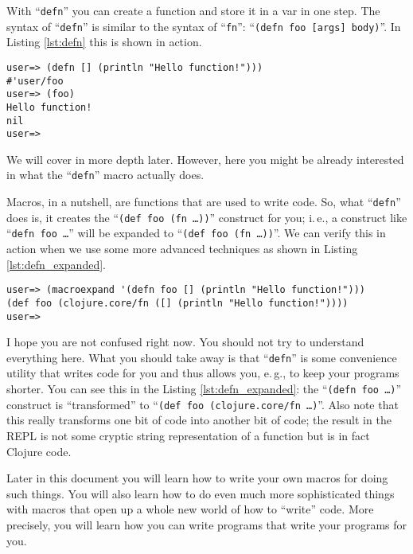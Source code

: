 With ``\texttt{defn}'' you can create a function and store it in a var in one step.
The syntax of ``\texttt{defn}'' is similar to the syntax of ``\texttt{fn}'': ``\texttt{(defn foo [args] body)}''.
In Listing \vref{lst:defn} this is shown in action.

\begin{lstlisting}[label=lst:defn, caption=``\texttt{defn}'' as Shortcut]
user=> (defn [] (println "Hello function!")))
#'user/foo
user=> (foo)
Hello function!
nil
user=> 
\end{lstlisting}

We will cover  in more depth later.
However, here you might be already interested in what the ``\texttt{defn}'' macro actually does.

Macros, in a nutshell, are functions that are used to write code.
So, what ``\texttt{defn}'' does is, it creates the ``\texttt{(def foo (fn \ldots))}'' construct for you;
i.\,e., a construct like ``\texttt{defn foo \ldots}'' will be expanded to ``\texttt{(def foo (fn \ldots))}''.
We can verify this in action when we use some more advanced techniques as shown in Listing \vref{lst:defn_expanded}.

\begin{lstlisting}[label=lst:defn_expanded, caption=``\texttt{defn}'' transforms your code to ``\texttt{(def foo (fn \ldots))}''.]
user=> (macroexpand '(defn foo [] (println "Hello function!")))
(def foo (clojure.core/fn ([] (println "Hello function!"))))
user=>
\end{lstlisting}

I hope you are not confused right now.
You should not try to understand everything here.
What you should take away is that ``\texttt{defn}'' is some convenience utility that writes code for you and thus allows you, e.\,g., to keep your programs shorter.
You can see this in the Listing \vref{lst:defn_expanded}: the ``\texttt{(defn foo \ldots)}'' construct is ``transformed'' to ``\texttt{(def foo (clojure.core/fn \ldots)}''.
Also note that this really transforms one bit of code into another bit of code;
the result in the REPL is not some cryptic string representation of a function but is in fact Clojure code.

Later in this document you will learn how to write your own macros for doing such things.
You will also learn how to do even much more sophisticated things with macros that open up a whole new world of how to ``write'' code.
More precisely, you will learn how you can write programs that write your programs for you.

